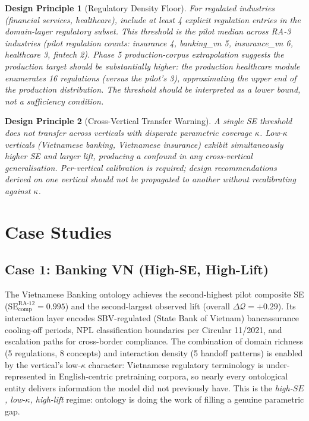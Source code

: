\documentclass[11pt,a4paper]{article}
\newtheorem{designprinciple}{Design Principle}
\newcommand{\se}{\mathrm{SE}}
\newcommand{\secomp}{\se_{\text{comp}}}
\newcommand{\kapp}{\kappa}
\begin{document}
\begin{designprinciple}[Regulatory Density Floor]
\label{dp:reg-intensity}
For regulated industries (financial services, healthcare), include
at least 4 explicit regulation entries in the domain-layer regulatory
subset. This threshold is the pilot median across RA-3 industries
(pilot regulation counts: insurance 4, banking\_vn 5, insurance\_vn 6,
healthcare 3, fintech 2). Phase 5 production-corpus extrapolation
suggests the production target should be substantially higher: the
production healthcare module enumerates 16 regulations (versus the
pilot's 3), approximating the upper end of the production
distribution. The threshold should be interpreted as a lower bound,
not a sufficiency condition.
\end{designprinciple}

\begin{designprinciple}[Cross-Vertical Transfer Warning]
\label{dp:transfer}
A single SE threshold does not transfer across verticals with disparate
parametric coverage $\kapp$. Low-$\kapp$ verticals (Vietnamese banking,
Vietnamese insurance) exhibit simultaneously higher SE and larger lift,
producing a confound in any cross-vertical generalisation. Per-vertical
calibration is required; design recommendations derived on one vertical
should not be propagated to another without recalibrating against
$\kapp$.
\end{designprinciple}

\section{Case Studies}
\label{sec:cases}

\subsection{Case 1: Banking VN (High-SE, High-Lift)}

The Vietnamese Banking ontology achieves the second-highest pilot
composite SE ($\secomp^{\text{RA-12}} = 0.995$) and the second-largest
observed lift (overall $\Delta \mathcal{Q} = +0.29$). Its interaction
layer encodes SBV-regulated (State Bank of Vietnam) bancassurance
cooling-off periods, NPL classification boundaries per Circular 11/2021,
and escalation paths for cross-border compliance. The combination of
domain richness (5 regulations, 8 concepts) and interaction density
(5 handoff patterns) is enabled by the vertical's low-$\kapp$ character:
Vietnamese regulatory terminology is under-represented in English-centric
pretraining corpora, so nearly every ontological entity delivers
information the model did not previously have. This is the
\emph{high-$SE$, low-$\kapp$, high-lift} regime: ontology is doing the
work of filling a genuine parametric gap.
\end{document}
